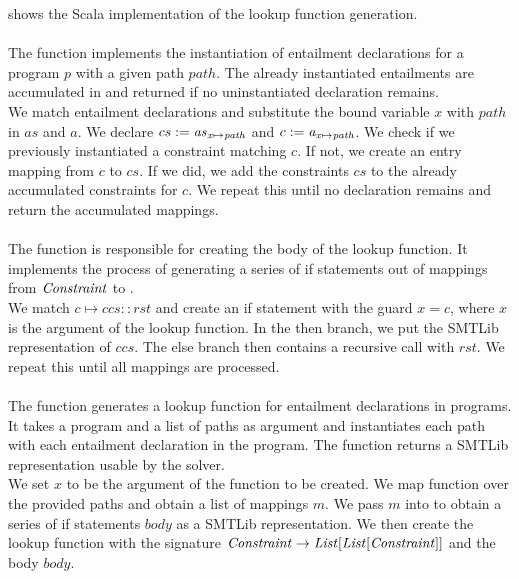 %
 shows the Scala implementation
of the lookup function generation.\\
\\
The function 
implements the instantiation of entailment declarations
for a program $p$ with a given path $path$.
The already instantiated entailments are accumulated
in 
and returned if no uninstantiated declaration remains.\\
%
We match entailment declarations 
and substitute the bound variable $x$ with $path$ in $as$ and $a$.
We declare $cs := \mathit{as}_{\mathit{x} \mapsto \mathit{path}}$ and $c := \mathit{a}_{\mathit{x} \mapsto \mathit{path}}$.
We check if we previously instantiated a constraint matching $c$.
If not, we create an entry mapping from $c$ to $cs$.
If we did, we add the constraints $cs$ to the already
accumulated constraints for $c$.
We repeat this until no declaration remains
and return the accumulated mappings.\\
\\
The function 
is responsible for creating the body of the lookup function.
It implements the process of generating a series
of if statements out of mappings from $\mathit{Constraint}$ to \Constrss.\\
%
We match $c \mapsto ccs :: rst$
and create an if statement with the guard $x = c$,
where $x$ is the argument of the lookup function.
In the then branch, we put the SMTLib representation of $ccs$.
The else branch then contains a recursive call with $rst$.
We repeat this until all mappings are processed.\\
\\
The function 
generates a lookup function for entailment declarations in programs.
It takes a program and a list of paths as argument
and instantiates each path with each
entailment declaration in the program.
The function returns a SMTLib representation usable by the solver.\\
%
We set $x$ to be the argument of the function to be created.
We map function 
over the provided paths and obtain a list of mappings $m$.
We pass $m$ into 
to obtain a series of if statements $body$ as a SMTLib representation.
We then create the lookup function with the signature
$\mathit{Constraint} \rightarrow \mathit{List[\mathit{List[\mathit{Constraint}]}]}$ and the body $body$.

\newpage
